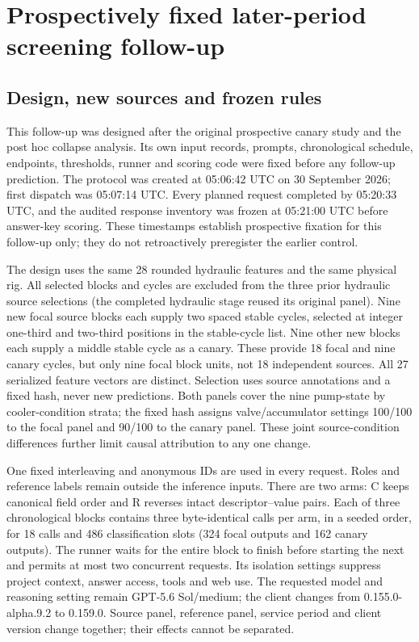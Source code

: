 \clearpage
\section{Prospectively fixed later-period screening follow-up}\label{app:canary_stability}
\subsection{Design, new sources and frozen rules}
This follow-up was designed after the original prospective canary study and the post hoc collapse analysis. Its own input records, prompts, chronological schedule, endpoints, thresholds, runner and scoring code were fixed before any follow-up prediction. The protocol was created at 05:06:42 UTC on 30 September 2026; first dispatch was 05:07:14 UTC. Every planned request completed by 05:20:33 UTC, and the audited response inventory was frozen at 05:21:00 UTC before answer-key scoring. These timestamps establish prospective fixation for this follow-up only; they do not retroactively preregister the earlier control.

The design uses the same 28 rounded hydraulic features and the same physical rig. All selected blocks and cycles are excluded from the three prior hydraulic source selections (the completed hydraulic stage reused its original panel). Nine new focal source blocks each supply two spaced stable cycles, selected at integer one-third and two-third positions in the stable-cycle list. Nine other new blocks each supply a middle stable cycle as a canary. These provide 18 focal and nine canary cycles, but only nine focal block units, not 18 independent sources. All 27 serialized feature vectors are distinct. Selection uses source annotations and a fixed hash, never new predictions. Both panels cover the nine pump-state by cooler-condition strata; the fixed hash assigns valve/accumulator settings 100/100 to the focal panel and 90/100 to the canary panel. These joint source-condition differences further limit causal attribution to any one change.

One fixed interleaving and anonymous IDs are used in every request. Roles and reference labels remain outside the inference inputs. There are two arms: C keeps canonical field order and R reverses intact descriptor--value pairs. Each of three chronological blocks contains three byte-identical calls per arm, in a seeded order, for 18 calls and 486 classification slots (324 focal outputs and 162 canary outputs). The runner waits for the entire block to finish before starting the next and permits at most two concurrent requests. Its isolation settings suppress project context, answer access, tools and web use. The requested model and reasoning setting remain GPT-5.6 Sol/medium; the client changes from 0.155.0-alpha.9.2 to 0.159.0. Source panel, reference panel, service period and client version change together; their effects cannot be separated.

